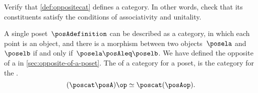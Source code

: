 \vfill
\begin{gradedexercise}
    \label{ex:OppositeCat}
    Verify that \cref{def:oppositecat} defines a category.
    In other words, check that its constituents satisfy the conditions of associativity and unitality.
\end{gradedexercise}



\begin{example}
    A single poset~$\posAdefinition$ can be described as a category, in which each point is an object, and there is a morphism between two objects~$\posela$ and~$\poselb$ if and only if~$\posela \posAleq \poselb$.
    We have defined the opposite of a  in \cref{sec:opposite-of-a-poset}.
    The  of a category for a poset, is the category for the .
    \begin{equation}
        (\poscat \posA)\op \simeq \poscat (\posAop) .
    \end{equation}
\end{example}
